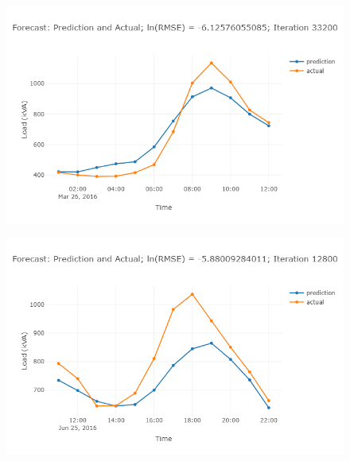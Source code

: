 \begin{figure}
\centering
\includegraphics[width=0.95\linewidth]{"images/prelim-plots/newplot (8)"}
\caption{}
\end{figure}

\begin{figure}
\centering
\includegraphics[width=0.95\linewidth]{"images/prelim-plots/newplot (9)"}
\caption{}
\end{figure}

